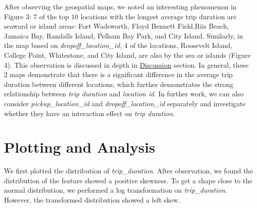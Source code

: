 \documentclass[11pt]{article}
\begin{document}
After observing the geospatial maps, we noted an interesting phenomenon in Figure 3: 7 of the top 10 locations with the longest average trip duration are seaward or island areas: Fort Wadsworth, Floyd Bennett Field,Riis Beach, Jamaica Bay, Randalls Island, Pelham Bay Park, and City Island. Similarly, in the map based on \textit{dropoff\_location\_id}, 4 of the locations, Roosevelt Island, College Point, Whitestone, and City Island, are also by the sea or islands (Figure 4). This observation is discussed in depth in \hyperref[sec:discussion]{Discussion} section. In general, these 2 maps demonstrate that there is a significant difference in the average trip duration between different locations, which further demonstrates the strong relationship between \textit{trip duration} and \textit{location id}. In further work, we can also consider \textit{pickup\_location\_id} and \textit{dropoff\_location\_id} separately and investigate whether they have an interaction effect on \textit{trip duration}.

\section{Plotting and Analysis}

We first plotted the distribution of \textit{trip\_duration}. After observation, we found the distribution of the feature showed a positive skewness. To get a shape close to the normal distribution, we performed a log transformation on 
\textit{trip\_duration}. However, the transformed distribution showed a left skew.
\end{document}
